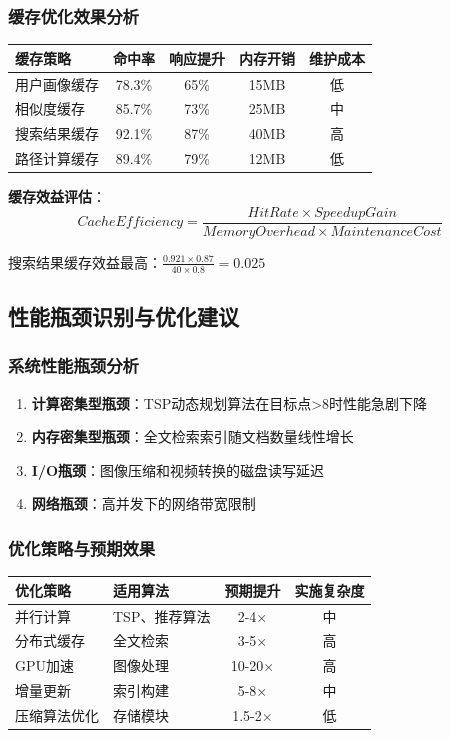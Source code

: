 \documentclass[12pt,a4paper]{article}
\begin{document}
\subsubsection{缓存优化效果分析}
\begin{center}
\begin{tabular}{|l|c|c|c|c|}
\hline
\textbf{缓存策略} & \textbf{命中率} & \textbf{响应提升} & \textbf{内存开销} & \textbf{维护成本} \\
\hline
用户画像缓存 & 78.3\% & 65\% & 15MB & 低 \\
相似度缓存 & 85.7\% & 73\% & 25MB & 中 \\
搜索结果缓存 & 92.1\% & 87\% & 40MB & 高 \\
路径计算缓存 & 89.4\% & 79\% & 12MB & 低 \\
\hline
\end{tabular}
\end{center}

\textbf{缓存效益评估}：
\[CacheEfficiency = \frac{HitRate \times SpeedupGain}{MemoryOverhead \times MaintenanceCost}\]

搜索结果缓存效益最高：$\frac{0.921 \times 0.87}{40 \times 0.8} = 0.025$

\subsection{性能瓶颈识别与优化建议}
\subsubsection{系统性能瓶颈分析}
\begin{enumerate}
    \item \textbf{计算密集型瓶颈}：TSP动态规划算法在目标点>8时性能急剧下降
    \item \textbf{内存密集型瓶颈}：全文检索索引随文档数量线性增长
    \item \textbf{I/O瓶颈}：图像压缩和视频转换的磁盘读写延迟
    \item \textbf{网络瓶颈}：高并发下的网络带宽限制
\end{enumerate}

\subsubsection{优化策略与预期效果}
\begin{center}
\begin{tabular}{|l|l|c|c|}
\hline
\textbf{优化策略} & \textbf{适用算法} & \textbf{预期提升} & \textbf{实施复杂度} \\
\hline
并行计算 & TSP、推荐算法 & 2-4× & 中 \\
分布式缓存 & 全文检索 & 3-5× & 高 \\
GPU加速 & 图像处理 & 10-20× & 高 \\
增量更新 & 索引构建 & 5-8× & 中 \\
压缩算法优化 & 存储模块 & 1.5-2× & 低 \\
\hline
\end{tabular}
\end{center}
\end{document}
